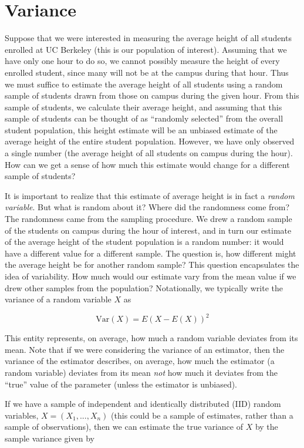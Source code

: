 \section{Variance}

Suppose that we were interested in measuring the average height of all students enrolled at UC Berkeley (this is our population of interest). Assuming that we have only one hour to do so, we cannot possibly measure the height of every enrolled student, since many will not be at the campus during that hour. Thus we must suffice to estimate the average height of all students using a random sample of students drawn from those on campus during the given hour. From this sample of students, we calculate their average height, and assuming that this sample of students can be thought of as ``randomly selected'' from the overall student population, this height estimate will be an unbiased estimate of the average height of the entire student population. However, we have only observed a single number (the average height of all students on campus during the hour). How can we get a sense of how much this estimate would change for a different sample of students? 

It is important to realize that this estimate of average height is in fact a \emph{random variable}. But what is random about it? Where did the randomness come from? The randomness came from the sampling procedure. We drew a random sample of the students on campus during the hour of interest, and in turn our estimate of the average height of the student population is a random number: it would have a different value for a different sample. The question is, how different might the average height be for another random sample? This question encapsulates the idea of variability. How much would our estimate vary from the mean value if we drew other samples from the population? Notationally, we typically write the variance of a random variable $X$ as

$$\text{Var}(X) = E \left( X - E(X) \right)^2$$


This entity represents, on average, how much a random variable deviates from its mean. Note that if we were considering the variance of an estimator, then the variance of the estimator describes, on average, how much the estimator (a random variable) deviates from its mean \emph{not} how much it deviates from the ``true'' value of the parameter (unless the estimator is unbiased).

If we have a sample of independent and identically distributed (IID) random variables, $X = (X_1, ..., X_n)$ (this could be a sample of estimates, rather than a sample of observations), then we can estimate the true variance of $X$ by the sample variance given by

